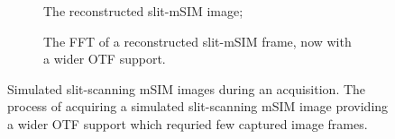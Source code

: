 \begin{figure}[ht!]
\begin{subfigure}[t]{0.3\textwidth}
      \caption{The reconstructed slit-\gls{mSIM} image;}
  \end{subfigure}\quad
  \begin{subfigure}[t]{0.3\textwidth}
        \centering
        \hspace{\textwidth}
    \end{subfigure}\quad
    \begin{subfigure}[t]{0.3\textwidth}
        \centering
        \caption{The \gls{FFT} of a reconstructed slit-\gls{mSIM} frame, now with a wider \gls{OTF} support.}
    \end{subfigure}
      \caption[Simulated slit-scanning \gls{mSIM} images during an acquisition]{
      Simulated slit-scanning \gls{mSIM} images during an acquisition.
      The process of acquiring a simulated slit-scanning \gls{mSIM} image providing a wider \gls{OTF} support which requried few captured image frames.
      }\label{fig:msim_slit}
\end{figure}
